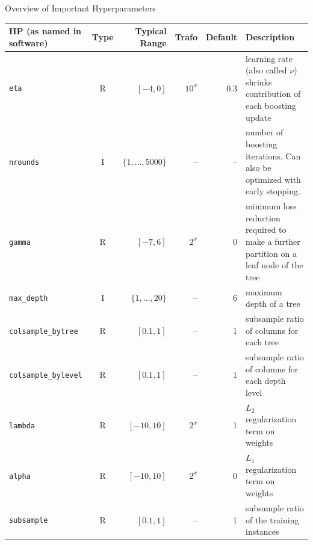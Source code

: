 \documentclass[11pt,compress,t,notes=noshow, xcolor=table]{beamer}
\begin{document}
\begin{vbframe}{Overview of Important Hyperparameters}
  \begin{tiny}

    \begin{table}[h!]
      \begin{tabular}{p{3cm}crrrp{3cm}} \toprule
        HP (as named in software)   & Type & Typical Range       & Trafo  & Default & Description                                                                            \\
        \midrule
        \texttt{eta}                & R    & $[-4, 0]$           & $10^x$ & 0.3     & learning rate (also called $\nu$) shrinks contribution of each boosting update         \\
        \texttt{nrounds}            & I    & $\{1,\ldots,5000\}$ & --     & --      & number of boosting iterations. Can also be optimized with early stopping.              \\
        \texttt{gamma}              & R    & $[-7,6]$            & $2^x$  & 0       & minimum loss reduction required to make a further partition on a leaf node of the tree \\
        \texttt{max\_depth}         & I    & $\{1,\ldots,20\}$   & --     & 6       & maximum depth of a tree                                                                \\
        \texttt{colsample\_bytree}  & R    & $[0.1,1]$           & --     & 1       & subsample ratio of columns for each tree                                               \\
        \texttt{colsample\_bylevel} & R    & $[0.1,1]$           & --     & 1       & subsample ratio of columns for each depth level                                        \\
        \texttt{lambda}             & R    & $[-10,10]$          & $2^x$  & 1       & $L_2$ regularization term on weights                                                   \\

        \texttt{alpha}              & R    & $[-10,10]$          & $2^x$  & 0       & $L_1$ regularization term on weights                                                   \\
        \texttt{subsample}          & R    & $[0.1,1]$           & --     & 1       & subsample ratio of the training instances                                              \\
        \bottomrule
      \end{tabular}
    \end{table}
  \end{tiny}
\end{vbframe}
\end{document}
